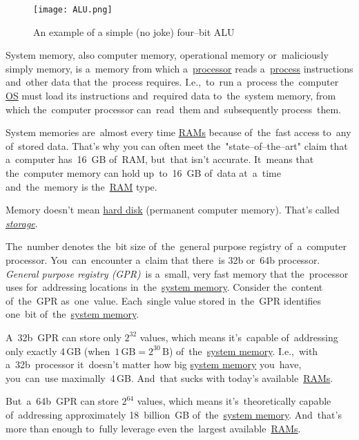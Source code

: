 \begin{figure}
    \centering
    \texttt{[image: ALU.png]}
    \caption*{An example of a simple (no joke) four--bit ALU}
\end{figure}
\newpage

\label{systemmemory}
System memory, also computer memory, operational memory or~maliciously simply memory, is a~memory from which a~\hyperref[processorcpucore]{processor} reads a~\hyperref[applicationprocessprogramservicethread]{process} instructions and~other data that the~process requires.
I.e.,~to~run a~process the~computer \hyperref[os]{OS} must load its instructions and~required data to~the~system memory, from which the~computer processor can~read~them and~subsequently process~them.

System memories are~almost every time \hyperref[ram]{RAMs} because of~the~fast access to~any of~stored data.
That's why you can often meet the~"state--of--the--art" claim that a~computer has~16~GB of~RAM, but~that isn't accurate.
It~means that the~computer memory can hold up~to~16~GB of~data at~a~time and~the~memory is the~\hyperref[ram]{RAM} type.

\warning Memory doesn't mean \hyperref[harddiskdrive]{hard disk} (permanent computer memory).
That's called \hyperref[harddiskdrive]{\textit{storage}}.

\label{32bvs64b}
The~number denotes the~bit size of~the~general purpose registry of~a~computer processor.
You~can~encounter a~claim that there~is 32b or~64b processor. \textit{General purpose registry (GPR)}~is a~small, very fast memory that the~processor uses for~addressing locations in~the~\hyperref[systemmemory]{system memory}.
Consider the~content of~the~GPR as~one~value.
Each~single value stored in~the~GPR identifies one~bit of~the~\hyperref[systemmemory]{system memory}.

A~32b~GPR can store only $2^{32}$ values, which means it's~capable of~addressing only exactly 4\,GB (when~$1\,\textrm{GB}=2^{30}\,\textrm{B}$) of~the~\hyperref[systemmemory]{system memory}.
I.e.,~with a~32b~processor it~doesn't matter how big \hyperref[systemmemory]{system memory} you~have, you~can~use maximally~4\,GB.
And~that sucks with today's available~\hyperref[ram]{RAMs}.

But~a~64b~GPR can store $2^{64}$ values, which means it's~theoretically capable of~addressing approximately 18~billion~GB of~the~\hyperref[systemmemory]{system memory}.
And~that's more than enough to~fully leverage even the~largest available~\hyperref[ram]{RAMs}.

